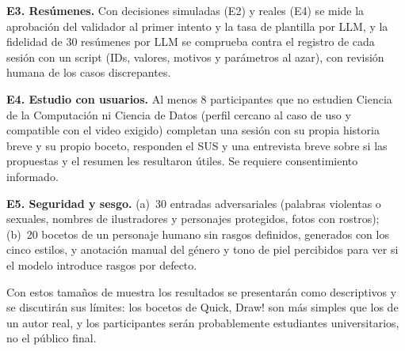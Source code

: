 \documentclass[10pt,a4paper,twocolumn]{article}
\begin{document}
\textbf{E3. Resúmenes.} Con decisiones simuladas (E2) y reales (E4) se mide la aprobación del validador al primer intento y la tasa de plantilla por LLM, y la fidelidad de 30 resúmenes por LLM se comprueba contra el registro de cada sesión con un script (IDs, valores, motivos y parámetros al azar), con revisión humana de los casos discrepantes.

\textbf{E4. Estudio con usuarios.} Al menos 8 participantes que no estudien Ciencia de la Computación ni Ciencia de Datos (perfil cercano al caso de uso y compatible con el video exigido) completan una sesión con su propia historia breve y su propio boceto, responden el SUS y una entrevista breve sobre si las propuestas y el resumen les resultaron útiles. Se requiere consentimiento informado.

\textbf{E5. Seguridad y sesgo.} (a)~30 entradas adversariales (palabras violentas o sexuales, nombres de ilustradores y personajes protegidos, fotos con rostros); (b)~20 bocetos de un personaje humano sin rasgos definidos, generados con los cinco estilos, y anotación manual del género y tono de piel percibidos para ver si el modelo introduce rasgos por defecto.

Con estos tamaños de muestra los resultados se presentarán como descriptivos y se discutirán sus límites: los bocetos de Quick, Draw! son más simples que los de un autor real, y los participantes serán probablemente estudiantes universitarios, no el público final.

\end{document}
